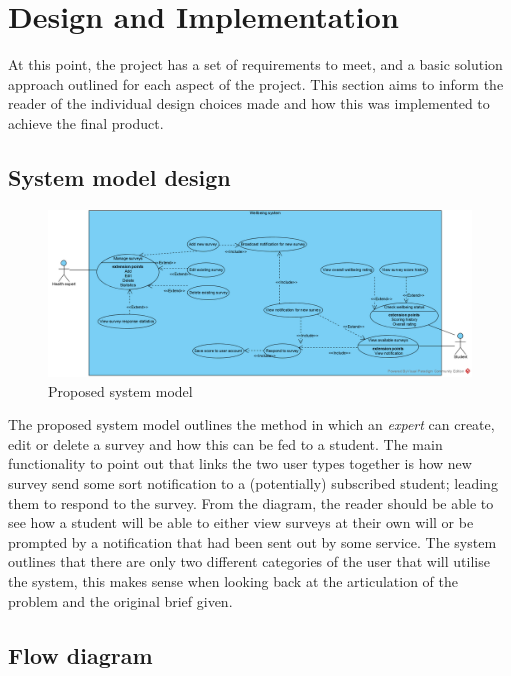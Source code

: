 \section{Design and Implementation}

At this point, the project has a set of requirements to meet, and a basic solution approach outlined for each aspect of 
the project.
This section aims to inform the reader of the individual design choices made and how this was implemented to achieve the final product.

\subsection{System model design} \label{system model design}

\begin{figure}[ht]
    \centering
    \includegraphics[width=450px]{images/system_model.png}
    \caption{Proposed system model}
    \label{proposedsystemmodel}
\end{figure}


The proposed system model outlines the method in which an \emph{expert} can create, edit or delete a survey and how this can be 
fed to a student.
The main functionality to point out that links the two user types together is how new survey send some sort notification 
to a (potentially) subscribed student; leading them to respond to the survey.
From the diagram, the reader should be able to see how a student will be able to either view surveys at their own will or be prompted
by a notification that had been sent out by some service.
The system outlines that there are only two different categories of the user that will utilise the system, this makes sense when looking
back at the articulation of the problem and the original brief given.

\clearpage
\subsection{Flow diagram}

